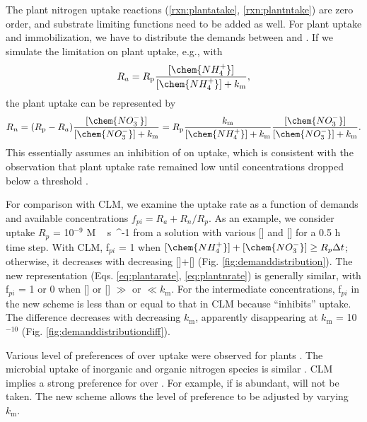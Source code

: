 \documentclass[gmd, manuscript]{copernicus}
\begin{document}
The plant nitrogen uptake reactions (\ref{rxn:plantatake},
\ref{rxn:plantntake}) are zero
order, and substrate limiting functions need
to be added as well. For plant uptake and immobilization, we have to
distribute the demands between  and . If we simulate
the  limitation on plant uptake, e.g., with
\begin{equation}
R_a = R_\text{p} \frac{[\chem{NH_4^+}]}{[\chem{NH_4^+}]+k_\text{m}}, 
\label{eq:plantarate}
\end{equation}
the  plant uptake can be represented by 
\begin{equation}
R_n = (R_\text{p} - R_a)\frac{[\chem{NO_3^-}]}{[\chem{NO_3^-}]+k_\text{m}} =
R_\text{p} \frac{k_\text{m}}{[\chem{NH_4^+}]+k_\text{m}}
\frac{[\chem{NO_3^-}]}{[\chem{NO_3^-}]+k_\text{m}}.  
\label{eq:plantnrate}
\end{equation}
This essentially assumes an inhibition of  on  uptake, which is consistent with
the observation that plant  uptake rate remained low
until  concentrations dropped below a threshold
\citep{eltrop1996}.  

For comparison with CLM, we examine the uptake rate as a function of demands
and available concentrations 
$f_{pi} = {R_a + R_n}/{R_p}$.
As an example, we consider uptake $R_p$ = 10$^{-9}$ \unit{M\,s{^{-1}}} from a
solution with various [] and [] for a 0.5 h time
step. With CLM, f$_{pi}$ = 1 when $[\chem{NH_4^+}]+[\chem{NO_3^-}]\geq
R_p\Delta t$; otherwise, it decreases with decreasing
[]+[] (Fig. \ref{fig:demanddistribution}). The new
representation (Eqs. \ref{eq:plantarate}, \ref{eq:plantnrate}) is generally
similar, with f$_{pi}$ = 1 or 0 when [] or [] $\gg$
or $\ll k_\text{m}$. For the intermediate concentrations, f$_{pi}$ in the new
scheme is less than or equal to that in CLM because  ``inhibits''
 uptake. The difference decreases with decreasing $k_\text{m}$,
apparently disappearing at $k_\text{m}$ = 10$^{-10}$ (Fig. \ref{fig:demanddistributiondiff}). 

Various level of preferences of  over  uptake were observed for plants
\citep{Pfautsch2009,Warren2007,Nordin2001,Falkengren1995,Gherardi2013}. The
microbial uptake of inorganic and organic nitrogen species is similar
\citep{Fouilland2007,Kirchman1994,Kirchman1998,Middelburg2000,Veuger2004}. CLM
implies a strong preference for  over . For example, if
 is abundant,  will not be taken. The new scheme
allows the level of preference to be adjusted by varying $k_\text{m}$.
\end{document}
